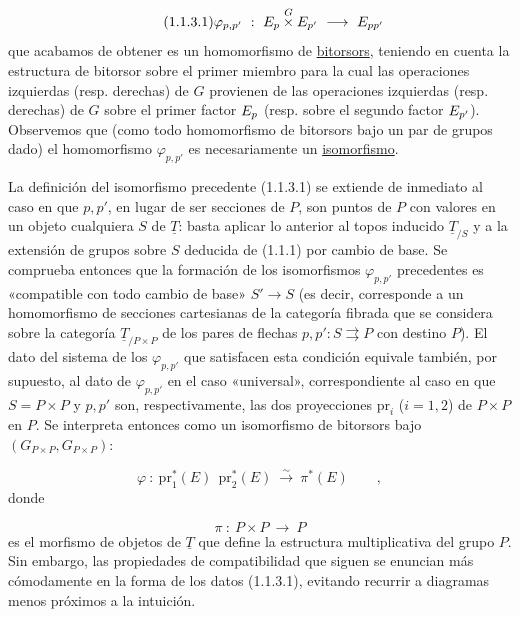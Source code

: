 \begin{equation}\tag{1.1.3.1}
\varphi_{p,p'} \ :\ \sisi{P_p}{E_p} \overset{G}{\times}
\sisi{P_{p'}}{E_{p'}} \ \longrightarrow\ \sisi{P_{pp'}}{E_{pp'}}
\end{equation}
que acabamos de obtener es un homomorfismo de \underline{bitorsors},
teniendo en cuenta la estructura de bitorsor sobre el primer miembro
para la cual las operaciones
izquierdas (resp. derechas) de $G$ provienen de las operaciones
izquierdas (resp. derechas) de $G$ sobre el primer factor
$\sisi{P_p}{E_p}$ (resp. sobre el segundo factor
$\sisi{P_{p'}}{E_{p'}}$). Observemos que (como todo homomorfismo de
bitorsors bajo un par de grupos dado) el homomorfismo
$\varphi_{p,p'}$ es necesariamente un \underline{isomorfismo}.

La definición del isomorfismo precedente (1.1.3.1) se extiende de
inmediato al caso en que $p,p'$, en lugar de ser secciones de $P$, son
puntos de $P$ con valores en un objeto cualquiera $S$ de
$\underline{T}$: basta aplicar lo anterior al topos inducido
$\underline{T}_{/S}$ y a la extensión de grupos sobre $S$ deducida de
(1.1.1) por cambio de base. Se comprueba entonces que la formación de
los isomorfismos $\varphi_{p,p'}$ precedentes es «compatible con todo
cambio de base» $S' \longrightarrow S$ (es decir, corresponde a un
homomorfismo de secciones cartesianas de la categoría fibrada que se
considera sobre la categoría $\underline{T}_{/P\times P}$ de los pares
de flechas $p,p' : S \rightrightarrows P$ con destino $P$). El dato del
sistema de los $\varphi_{p,p'}$ que satisfacen esta condición equivale
también, por supuesto, al dato de $\varphi_{p,p'}$ en el caso
«universal», correspondiente al caso en que $S = P\times P$ y $p,p'$
son, respectivamente, las dos proyecciones $\mathrm{pr}_i$ ($i=1,2$)
de $P\times P$ en $P$. Se interpreta entonces como un isomorfismo de
bitorsors bajo $(G_{P\times P},G_{P\times P})$:

\begin{equation}\tag{1.1.3.2}
\varphi \ :\ \mathrm{pr}_1^*(E)\ \ \mathrm{pr}_2^*(E)\ \overset{\sim}{\longrightarrow}\ \pi^*(E) \qquad ,
\end{equation}
donde

\begin{equation*}
\pi \ :\ P\times P \ \longrightarrow\ P
\end{equation*}
es el morfismo de objetos de $\underline{T}$ que define la estructura
multiplicativa del grupo $P$. Sin embargo, las propiedades de
compatibilidad que siguen se enuncian más cómodamente en la forma de los
datos (1.1.3.1), evitando recurrir a diagramas menos próximos a la
intuición.


